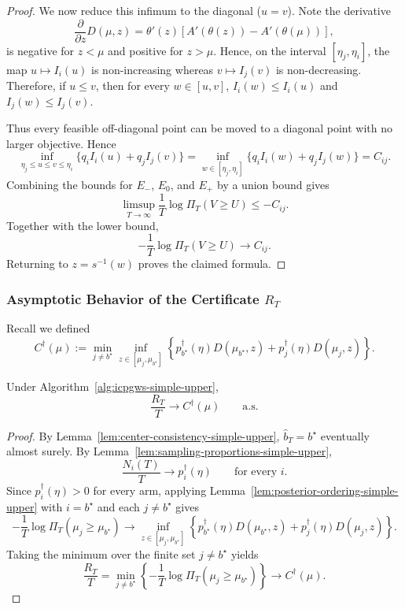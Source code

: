 \documentclass[10pt]{article}
\theoremstyle{plain}
\begin{document}
\begin{proof}
We now reduce this infimum to the diagonal ($u=v$). Note the derivative $$
\frac{\partial }{\partial z} D(\mu,z) = \theta'(z)\left[ A'(\theta(z))-A'(\theta(\mu)) \right],
$$
is negative for $z<\mu$ and positive for $z>\mu$. Hence, on the interval
\([\eta_j,\eta_i]\), the map \(u\mapsto I_i(u)\) is non-increasing whereas \(v\mapsto I_j(v)\) is non-decreasing.
Therefore, if \(u\le v\), then for every \(w\in[u,v]\), $I_i(w)\le I_i(u)$ and $I_j(w)\le I_j(v)$.

Thus every feasible off-diagonal point can be moved to a diagonal point with no
larger objective.  Hence
\[
    \inf_{\eta_j\le u\le v\le \eta_i}
    \{q_iI_i(u)+q_jI_j(v)\}
    =
    \inf_{w\in[\eta_j,\eta_i]}
    \{q_iI_i(w)+q_jI_j(w)\}
    =
    C_{ij}.
\]
Combining the bounds for \(E_-\), \(E_0\), and \(E_+\) by a union bound gives
\[
    \limsup_{T\to\infty}
    \frac1T\log \varPi_T(V\ge U)
    \le
    -C_{ij}.
\]
Together with the lower bound,
\[
    -\frac1T\log\varPi_T(V\ge U)\to C_{ij}.
\]
Returning to \(z=s^{-1}(w)\) proves the claimed formula.

\end{proof}

\subsubsection{Asymptotic Behavior of the Certificate $R_T$}

Recall we defined
\begin{equation}
    C^\dagger(\mu)
    :=
    \min_{j\neq b^\star}
    \inf_{z\in[\mu_j,\mu_{b^\star}]}
    \left\{
        p_{b^\star}^\dagger(\eta) D(\mu_{b^\star},z)
        +
        p_j^\dagger(\eta) D(\mu_j,z)
    \right\}.
\end{equation}

\begin{lemma}
\label{lem:RT-limit-simple-upper}
Under Algorithm~\ref{alg:icpgws-simple-upper},
\[
    \frac{R_T}{T}
    \to
    C^\dagger(\mu)
    \qquad\text{a.s.}
\]
\end{lemma}

\begin{proof}
By Lemma~\ref{lem:center-consistency-simple-upper}, $\widehat b_T=b^\star$ eventually almost surely.  By Lemma~\ref{lem:sampling-proportions-simple-upper},
\[
    \frac{N_i(T)}{T}\to p_i^\dagger(\eta)
    \qquad\text{for every }i.
\]
Since \(p_i^\dagger(\eta)>0\) for every arm, applying
Lemma~\ref{lem:posterior-ordering-simple-upper} with \(i=b^\star\) and each
\(j\neq b^\star\) gives
\[
    -\frac1T
    \log
    \varPi_T(\mu_j\ge \mu_{b^\star})
    \to
    \inf_{z\in[\mu_j,\mu_{b^\star}]}
    \left\{
        p_{b^\star}^\dagger(\eta) D(\mu_{b^\star},z)
        +
        p_j^\dagger(\eta) D(\mu_j,z)
    \right\}.
\]
Taking the minimum over the finite set \(j\neq b^\star\) yields
\[
    \frac{R_T}{T}
    =
    \min_{j\neq b^\star}
    \left\{
        -\frac1T\log
        \varPi_T(\mu_j\ge \mu_{b^\star})
    \right\}
    \to
    C^\dagger(\mu). 
\]

\end{proof}
\end{document}
